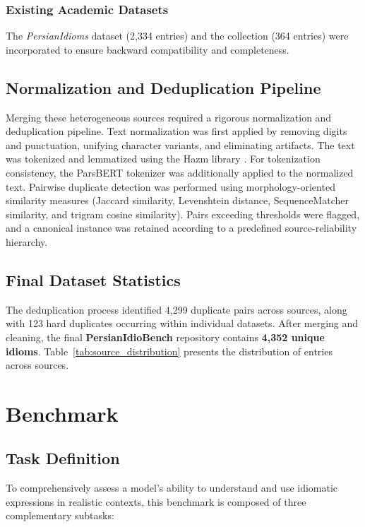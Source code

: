 \documentclass[11pt,a4paper]{article}
\begin{document}
\subsubsection{Existing Academic Datasets}
The \textit{PersianIdioms} dataset (2,334 entries) and the \citet{ostovar2014persianidioms} collection (364 entries) were incorporated to ensure backward compatibility and completeness.

\subsection{Normalization and Deduplication Pipeline}
Merging these heterogeneous sources required a rigorous normalization and deduplication pipeline. Text normalization was first applied by removing digits and punctuation, unifying character variants, and eliminating artifacts. The text was tokenized and lemmatized using the Hazm library \cite{roshan2014hazm}. For tokenization consistency, the ParsBERT tokenizer \cite{farahani2021parsbert} was additionally applied to the normalized text. Pairwise duplicate detection was performed using morphology-oriented similarity measures (Jaccard similarity, Levenshtein distance, SequenceMatcher similarity, and trigram cosine similarity). Pairs exceeding thresholds were flagged, and a canonical instance was retained according to a predefined source-reliability hierarchy.

\subsection{Final Dataset Statistics}
The deduplication process identified 4,299 duplicate pairs across sources, along with 123 hard duplicates occurring within individual datasets. After merging and cleaning, the final \textbf{PersianIdioBench} repository contains \textbf{4,352 unique idioms}. Table~\ref{tab:source_distribution} presents the distribution of entries across sources.

\section{Benchmark}
\subsection{Task Definition}
To comprehensively assess a model’s ability to understand and use idiomatic expressions in realistic contexts, this benchmark is composed of three complementary subtasks:
\end{document}
